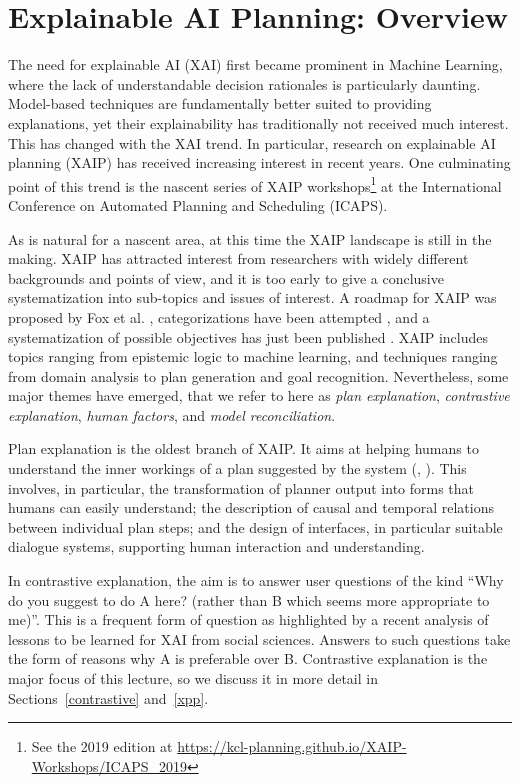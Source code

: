 \section{Explainable AI Planning: Overview}
\label{xaip}

The need for explainable AI (XAI) first became prominent in Machine
Learning, where the lack of understandable decision rationales is
particularly daunting. Model-based techniques are fundamentally better
suited to providing explanations, yet their explainability has
traditionally not received much interest. This has changed with the
XAI trend. In particular, research on explainable AI planning (XAIP)
has received increasing interest in recent years. One culminating
point of this trend is the nascent series of XAIP
workshops\footnote{See the 2019 edition at
  \url{https://kcl-planning.github.io/XAIP-Workshops/ICAPS_2019}} at
the International Conference on Automated Planning and Scheduling
(ICAPS).

As is natural for a nascent area, at this time the XAIP landscape is
still in the making. XAIP has attracted interest from researchers with
widely different backgrounds and points of view, and it is too early
to give a conclusive systematization into sub-topics and issues of
interest. A roadmap for XAIP was proposed by Fox et
al. \cite{fox:etal:ijcai-ws-17}, categorizations have been attempted
\cite{langley:etal:aaai-17}, and a systematization of possible
objectives has just been published \cite{chakraborti:icaps-19}. XAIP
includes topics ranging from epistemic logic to machine learning, and
techniques ranging from domain analysis to plan generation and goal
recognition. Nevertheless, some major themes have emerged, that we
refer to here as \emph{plan explanation}, \emph{contrastive
  explanation}, \emph{human factors}, and \emph{model reconciliation}.

Plan explanation is the oldest branch of XAIP. It aims at helping
humans to understand the inner workings of a plan suggested by the
system (\eg,
\cite{mcguiness:etal:flairs-07,khan:etal:icaps-09,bidot:etal:mkwi-10,sohrabi:etal:aaai-11,seegebarth:etal:icaps-12,bercher:etal:icaps-14,nothdurft:etal:sigdal-15}). This
involves, in particular, the transformation of planner output into
forms that humans can easily understand; the description of causal and
temporal relations between individual plan steps; and the design of
interfaces, in particular suitable dialogue systems, supporting human
interaction and understanding.

In contrastive explanation, the aim is to answer user questions of the
kind ``Why do you suggest to do A here? (rather than B which seems
more appropriate to me)''. This is a frequent form of question as
highlighted by a recent analysis \cite{miller:ai-19} of lessons to be
learned for XAI from social sciences. Answers to such questions take
the form of reasons why A is preferable over B. Contrastive
explanation is the major focus of this lecture, so we discuss it in
more detail in Sections~\ref{contrastive} and~\ref{xpp}.


